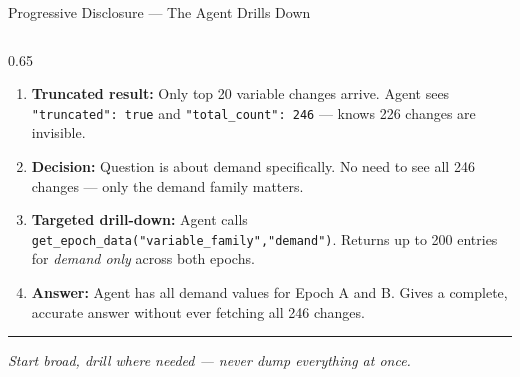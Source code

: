 \documentclass[aspectratio=169,10pt]{beamer}
\begin{document}
\begin{frame}[t]{Progressive Disclosure — The Agent Drills Down}
\begin{columns}[T]
\begin{column}{0.65\textwidth}
\begin{enumerate}
            solution diff summary.
      \item \textbf{Truncated result:} Only top 20 variable
            changes arrive. Agent sees \texttt{"truncated": true}
            and \texttt{"total\_count": 246} — knows 226 changes
            are invisible.
      \item \textbf{Decision:} Question is about demand
            specifically. No need to see all 246 changes —
            only the demand family matters.
      \item \textbf{Targeted drill-down:} Agent calls
            \texttt{get\_epoch\_data("variable\_family","demand")}.
            Returns up to 200 entries for \emph{demand only}
            across both epochs.
      \item \textbf{Answer:} Agent has all demand values for
            Epoch A and B. Gives a complete, accurate answer
            without ever fetching all 246 changes.
    \end{enumerate}
    \vspace{6pt}
    \textcolor{aorng}{\rule[0.4ex]{0.25cm}{0.7pt}}\;
    \textcolor{aorng}{\scriptsize\textit{Start broad, drill where needed — never dump everything at once.}}
  \end{column}
\end{columns}
\end{frame}
\end{document}
